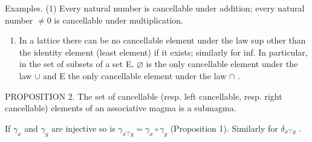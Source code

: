 Examples. (1) Every natural number is cancellable under addition; every natural number \(\neq 0\) is cancellable under multiplication.

\begin{enumerate}
\def\labelenumi{(\arabic{enumi})}
\setcounter{enumi}{1}
\tightlist
\item
  In a lattice there can be no cancellable element under the law sup other than the identity element (least element) if it exists; similarly for inf. In particular, in the set of subsets of a set E, \(\varnothing\) is the only cancellable element under the law \(\cup\) and E the only cancellable element under the law \(\cap\) .
\end{enumerate}

PROPOSITION 2. The set of cancellable (resp. left cancellable, resp. right cancellable) elements of an associative magma is a submagma.

If \(\gamma_{x}\) and \(\gamma_{y}\) are injective so is \(\gamma_{x\top y} = \gamma_{x}\circ \gamma_{y}\) (Proposition 1). Similarly for \(\delta_{x\top y}\) .

